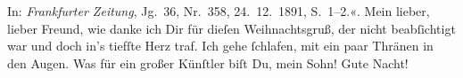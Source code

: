 \begin{ledgroupsized}[t]{13cm}
{{{                     In: \emph{Frankfurter Zeitung}, Jg. 36, Nr. 358,
                        24. 12. 1891, S. 1–2.}}}\label{K_L02677-3h}«. Mein lieber, lieber
               Freund, wie danke ich Dir für dieſen Weihnachtsgruß, der nicht beabſichtigt war und
               doch in’s tiefſte Herz traf. Ich gehe ſchlafen, mit ein paar Thränen in den Augen.
               Was für ein großer Künſtler biſt Du, mein Sohn!\pend
           \pstart
           Gute Nacht!\pend
           
         
         \endnumbering{}\end{ledgroupsized}  \newcommand{\dateiname}{L02677}\newcommand{\titel}{Paul Goldmann an Arthur Schnitzler, 24. 12. [1891]}\newcommand{\editorInnen}{Martin Anton Müller und Laura Untner}
      